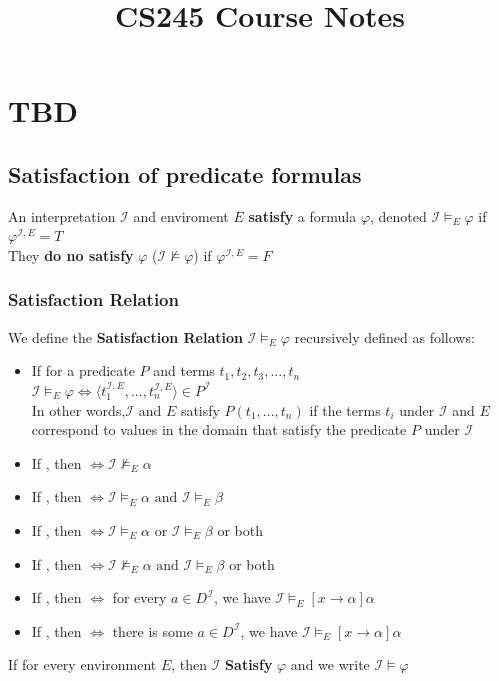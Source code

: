 \documentclass{report}
\title{CS245 Course Notes}
\begin{document}
\maketitle
\tableofcontents
\chapter{TBD}
\section{Satisfaction of predicate formulas}
\begin{defbox}
An interpretation $\mathcal I$ and enviroment $E$ \textbf{satisfy}  a formula $\varphi$, denoted $\mathcal I\vDash_E \varphi$ if $\varphi^{{\mathcal I},E} = T$\\
They \textbf{do no satisfy} $\varphi$ ($\mathcal I\nvDash \varphi$) if $\varphi^{{\mathcal I},E} = F$
\end{defbox}
\subsection{Satisfaction Relation}
We define the \textbf{Satisfaction Relation} $\mathcal{I} \vDash_E \varphi$ recursively defined as follows:
\begin{itemize}
\item If  for a predicate $P$ and terms $t_1,t_2,t_3,...,t_n$\\
$\mathcal{I}\vDash_E \varphi\iff\langle{t_1^{\mathcal{I},E}},...,{t_n^{\mathcal{I},E}}\rangle\in P^\mathcal{I}$\\In other words,$\mathcal{I}$ and $E$ satisfy $P(t_1,...,t_n)$ if the terms $t_i$ under $\mathcal{I}$ and $E$ correspond to values in the domain that satisfy the predicate $P$ under $\mathcal{I}$
\item If \ibx{$\varphi = (\neg \alpha)$}, then \iep $\iff \mathcal{I} \nvDash_E \alpha$
\item If \ibx{$\varphi = (\alpha \land \beta)$}, then \iep $\iff\mathcal{I} \vDash_E \alpha\text{ and }\mathcal{I} \vDash_E \beta$
\item If \ibx{$\varphi = (\alpha \lor \beta)$}, then \iep $\iff\mathcal{I} \vDash_E \alpha\text{ or }\mathcal{I} \vDash_E \beta$ or both
\item If \ibx{$\varphi = (\alpha \to \beta)$}, then \iep $\iff\mathcal{I} \nvDash_E \alpha\text{ and }\mathcal{I} \vDash_E \beta$ or both
\item If , then \iep $\iff$ for every $a\in D^\mathcal{I}$, we have $\mathcal{I}\vDash_E[x\to\alpha]\alpha$
\item If , then \iep $\iff$ there is some $a\in D^\mathcal{I}$, we have $\mathcal{I}\vDash_E[x\to\alpha]\alpha$
\end{itemize}
If \iep for every environment $E$, then $\mathcal{I}$ \textbf{Satisfy} $\varphi$ and we write $\mathcal{I} \vDash\varphi$ 
\end{document}
